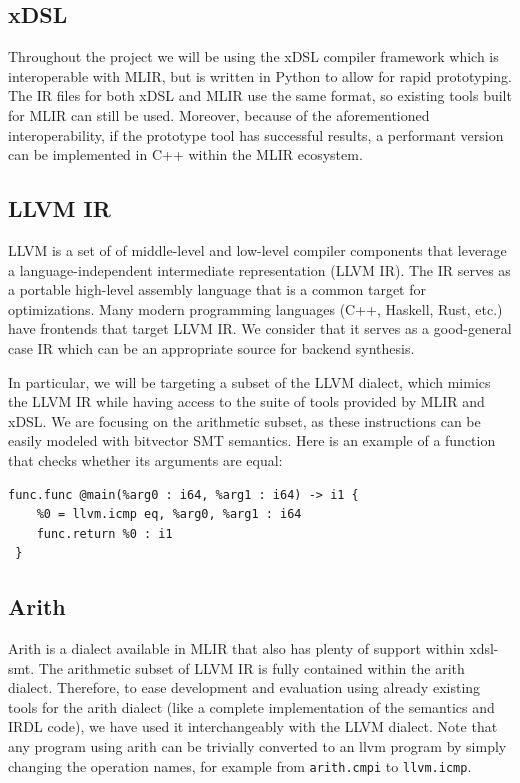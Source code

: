 \subsection*{xDSL}

Throughout the project we will be using the xDSL compiler framework \cite{xdsl} which is 
interoperable with MLIR, but is written in Python to allow for rapid prototyping. The IR files for
both xDSL and MLIR use the same format, so existing tools built for MLIR can still be used.
Moreover, because of the aforementioned interoperability, if the prototype tool has successful
results, a performant version can be implemented in C++ within the MLIR ecosystem.

\subsection*{LLVM IR}

LLVM is a set of of middle-level and low-level compiler components that leverage a 
language-independent intermediate representation (LLVM IR). The IR serves as a portable 
high-level assembly language that is a common target for optimizations. Many modern programming 
languages (C++, Haskell, Rust, etc.) have frontends that target LLVM IR. We consider that it serves 
as a good-general case IR which can be an appropriate source for backend synthesis. 

In particular, we will be targeting a subset of the LLVM dialect, which mimics the
LLVM IR while having access to the suite of tools provided by MLIR and xDSL. We are focusing on
the arithmetic subset, as these instructions can be easily modeled with bitvector SMT semantics.
Here is an example of a function that checks whether its arguments are equal:
\begin{verbatim}
func.func @main(%arg0 : i64, %arg1 : i64) -> i1 {
    %0 = llvm.icmp eq, %arg0, %arg1 : i64
    func.return %0 : i1
 }
\end{verbatim}

\subsection*{Arith}

Arith is a dialect available in MLIR that also has plenty of support within xdsl-smt. The arithmetic 
subset of LLVM IR is fully contained within the arith dialect. Therefore, to ease development
and evaluation using already existing tools for the arith dialect (like a complete implementation of 
the semantics and IRDL code), we have used it interchangeably with the LLVM dialect. Note that any 
program using arith can be trivially converted to an llvm program by simply changing the operation
names, for example from \texttt{arith.cmpi} to \texttt{llvm.icmp}.

